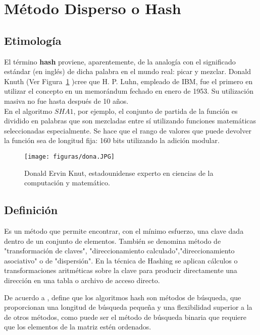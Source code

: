 \documentclass[10pt,conference]{IEEEtran}
\begin{document}
\section{\textbf{Método Disperso o Hash}} 
\subsection{\textbf{Etimología}}
El término \textbf {hash} proviene, aparentemente, de la analogía con el significado estándar (en inglés) de dicha palabra en el mundo real: picar y mezclar.
Donald Knuth (Ver Figura~\ref{f0} )cree que H. P. Luhn, empleado de IBM, fue el primero en utilizar el concepto en un memorándum fechado en enero de 1953. Su utilización masiva no fue hasta después de 10 años. \\
En el algoritmo $SHA 1$, por ejemplo, el conjunto de partida de la función es dividido en palabras que son mezcladas entre sí utilizando funciones matemáticas seleccionadas especialmente. Se hace que el rango de valores que puede devolver la función sea de longitud fija: 160 bits utilizando la adición modular.
\begin{figure}[H]
 \begin{center}
       \texttt{[image: figuras/dona.JPG]}
      \caption{Donald Ervin Knut, estadounidense experto en ciencias de la computación y matemático.}
      \label{f0} 
      \end{center}
\end{figure}

\subsection{\textbf{Definición}}
Es un método que permite encontrar, con el mínimo esfuerzo, una clave dada dentro de un conjunto de elementos. También se denomina método de "transformación de claves", "direccionamiento calculado","direccionamiento asociativo" o de "dispersión". En la técnica de Hashing se aplican cálculos o transformaciones aritméticas sobre la clave para producir directamente una dirección en una tabla o archivo de acceso directo.

\par De acuerdo a \citep{sierra}, define que los algoritmos hash son métodos de búsqueda, que proporcionan una longitud de búsqueda pequeña y una flexibilidad superior a la de otros métodos, como puede ser el método de búsqueda binaria que requiere que los elementos de la matriz
estén ordenados.
\end{document}
